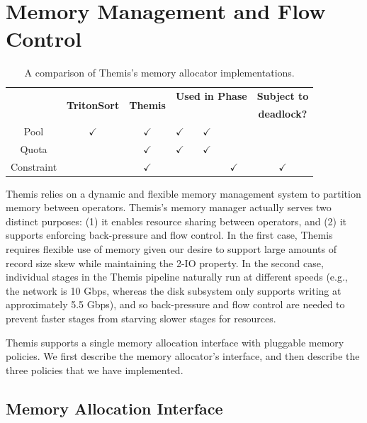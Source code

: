 \section{Memory Management and Flow Control}
\label{sec:memory}

\begin{table}
  \centering
  \caption{\label{fig:memory-allocator-compare} A comparison of Themis's memory
    allocator implementations.}
  \tabcolsep=0.11cm

  \begin{tabular}{|c|c|c|p{.7cm}|p{.7cm}|p{.7cm}|c|} \hline
    & \multirow{2}{*}{\textbf{TritonSort}} & \multirow{2}{*}{\textbf{Themis}}
    & \multicolumn{3}{c|}{\textbf{Used in Phase}} & \textbf{Subject to} \\\cline{4-6}
    & & & \centering 0 & \centering 1 & \centering 2 & \textbf{deadlock?} \\ \hline
    Pool & $\checkmark$ & $\checkmark$ & \centering $\checkmark$ & \centering $\checkmark$ & & \\\hline
    Quota &  & $\checkmark$ & \centering $\checkmark$ & \centering $\checkmark$ & &  \\\hline
    Constraint &  & $\checkmark$ &  &  & \centering $\checkmark$ & $\checkmark$ \\\hline
  \end{tabular}
\end{table}

Themis relies on a dynamic and flexible memory management system
to partition memory between operators.
Themis's memory manager actually serves two distinct purposes: (1) it
enables resource sharing between operators, and (2) it supports
enforcing back-pressure and flow control.  In the first case, Themis requires
flexible use of memory given our desire to support large amounts of record
size
skew while maintaining the 2-IO property.  In the second case, individual
stages in the Themis pipeline naturally run at different speeds (e.g.,
the network is 10 Gbps, whereas the disk subsystem only supports writing
at approximately 5.5 Gbps), and so back-pressure and flow control are needed
to prevent faster stages from starving slower stages for resources.

Themis supports a single memory allocation interface with pluggable memory
policies.  We first describe the memory allocator's interface, and then
describe the three policies that we have implemented.

\subsection{Memory Allocation Interface}

